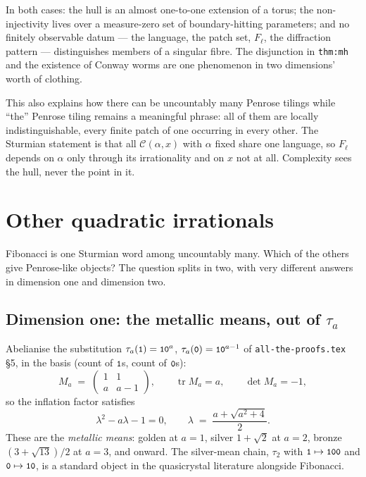 \documentclass[11pt,a4paper]{article}
\newcommand{\seq}[1]{\texttt{\small #1}}
\newcommand{\C}{\mathcal{C}}
\theoremstyle{definition}
\theoremstyle{plain}
\begin{document}
In both cases: the hull is an almost one-to-one extension of a torus; the
non-injectivity lives over a measure-zero set of boundary-hitting parameters;
and no finitely observable datum --- the language, the patch set, $F_\ell$, the
diffraction pattern --- distinguishes members of a singular fibre. The
disjunction in \texttt{thm:mh} and the existence of Conway worms are one
phenomenon in two dimensions' worth of clothing.

This also explains how there can be uncountably many Penrose tilings while
``the'' Penrose tiling remains a meaningful phrase: all of them are locally
indistinguishable, every finite patch of one occurring in every other. The
Sturmian statement is that all $\C(\alpha,x)$ with $\alpha$ fixed share one
language, so $F_\ell$ depends on $\alpha$ only through its irrationality and on
$x$ not at all. Complexity sees the hull, never the point in it.

\section{Other quadratic irrationals}

Fibonacci is one Sturmian word among uncountably many. Which of the others
give Penrose-like objects? The question splits in two, with very different
answers in dimension one and dimension two.

\subsection{Dimension one: the metallic means, out of $\tau_a$}

Abelianise the substitution $\tau_a(\seq{1}) = \seq{1}\seq{0}^a$,
$\tau_a(\seq{0}) = \seq{1}\seq{0}^{a-1}$ of
\texttt{all-the-proofs.tex} \S5, in the basis (count of $\seq{1}$s, count of
$\seq{0}$s):
\[
  M_a \;=\; \begin{pmatrix} 1 & 1 \\ a & a-1 \end{pmatrix},
  \qquad \operatorname{tr} M_a = a, \qquad \det M_a = -1 ,
\]
so the inflation factor satisfies
\[
  \lambda^2 - a\lambda - 1 = 0, \qquad
  \lambda \;=\; \frac{a + \sqrt{a^2+4}}{2} .
\]
These are the \emph{metallic means}: golden at $a=1$, silver $1+\sqrt 2$ at
$a=2$, bronze $(3+\sqrt{13})/2$ at $a=3$, and onward. The silver-mean chain,
$\tau_2$ with $\seq{1} \mapsto \seq{100}$ and $\seq{0} \mapsto \seq{10}$, is a
standard object in the quasicrystal literature alongside Fibonacci.
\end{document}
